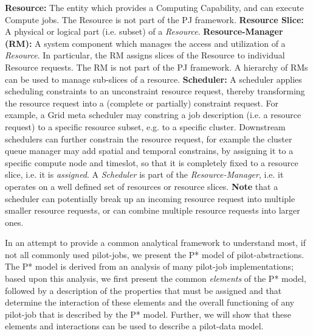 \documentclass[conference,final]{IEEEtran}
\newcommand{\alnote}[1]{ {\textcolor{blue} { ***andre: #1 }}}
\newcommand{\alnote}[1]{}
\begin{document}
\textbf{Resource:} The entity which provides a Computing Capability,
and can execute Compute jobs.  The Resource is not part of the PJ
framework. \textbf{Resource Slice:} A physical or logical part (i.e.
subset) of a \emph{Resource}. \textbf{Resource-Manager (RM):} A system
component which manages the access and utilization of a
\emph{Resource}.  In particular, the RM assigns slices of the Resource
to individual Resource requests.  The RM is not part of the PJ
framework.  A hierarchy of RMs can be used to manage sub-slices of a
resource.  \textbf{Scheduler:} A scheduler applies scheduling
constraints to an unconstraint resource request, thereby transforming
the resource request into a (complete or partially) constraint
request.  For example, a Grid meta scheduler may constring a job
description (i.e. a resource request) to a specific resource subset,
e.g. to a specific cluster.  Downstream schedulers can further
constrain the resource request, for example the cluster queue manager
may add spatial and temporal constrains, by assigning it to a specific
compute node and timeslot, so that it is completely fixed to a
resource slice, i.e. it is \emph{assigned}.  A \emph{Scheduler} is
part of the \emph{Resource-Manager}, i.e. it operates on a well
defined set of resources or resource slices. \textbf{Note} that a
scheduler can potentially break up an incoming resource request into
multiple smaller resource requests, or can combine multiple resource
requests into larger ones.
 

In an attempt to provide a common analytical framework to understand
most, if not all commonly used pilot-jobs, we
present the P* model of pilot-abstractions. The P* model is derived
from an analysis of many pilot-job implementations; based upon this
analysis, we first present the common {\it elements} of the P* model,
followed by a description of the properties that must be assigned and
that determine the interaction of these elements and the overall
functioning of any pilot-job that is described by the P*
model. Further, we will show that these elements and interactions can
be used to describe a pilot-data model.



\end{document}
